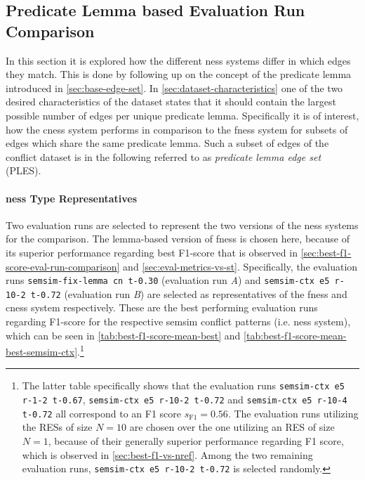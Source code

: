 \documentclass[11pt]{scrreprt}
\begin{document}
{\subsection{Predicate Lemma based Evaluation Run Comparison}
In this section it is explored how the different \gls{ness} systems differ in which edges they match. This is done by following up on the concept of the predicate lemma introduced in \cref{sec:base-edge-set}. In \cref{sec:dataset-characteristics} one of the two desired characteristics of the dataset states that it should contain the largest possible number of edges per unique predicate lemma. Specifically it is of interest, how the \gls{cness} system performs in comparison to the \gls{fness} system for subsets of edges which share the same predicate lemma. Such a subset of edges of the conflict dataset is in the following referred to as \textit{predicate lemma edge set} (PLES).


\paragraph{\gls{ness} Type Representatives}
Two evaluation runs are selected to represent the two versions of the \gls{ness} systems for the comparison. The lemma-based version of \gls{fness} is chosen here, because of its superior performance regarding best F1-score that is observed in \cref{sec:best-f1-score-eval-run-comparison} and \cref{sec:eval-metrics-vs-st}. Specifically, the evaluation runs \texttt{semsim-fix-lemma cn t-0.30} (evaluation run \textit{A}) and \texttt{semsim-ctx e5 r-10-2 t-0.72} (evaluation run \textit{B}) are selected as representatives of the \gls{fness} and \gls{cness} system respectively. These are the best performing evaluation runs regarding F1-score for the respective semsim conflict patterns (i.e. \gls{ness} system), which can be seen in \cref{tab:best-f1-score-mean-best} and \cref{tab:best-f1-score-mean-best-semsim-ctx}.\footnote{
The latter table specifically shows that the evaluation runs \texttt{semsim-ctx e5 r-1-2 t-0.67}, \texttt{semsim-ctx e5 r-10-2 t-0.72} and \texttt{semsim-ctx e5 r-10-4 t-0.72} all correspond to an F1 score \(s_\text{F1} = 0.56\). The evaluation runs utilizing the RESs of size \(N = 10\) are chosen over the one utilizing an RES of size \(N = 1\), because of their generally superior performance regarding F1 score, which is observed in \cref{sec:best-f1-vs-nref}. Among the two remaining evaluation runs, \texttt{semsim-ctx e5 r-10-2 t-0.72} is selected randomly.


}}
\end{document}
